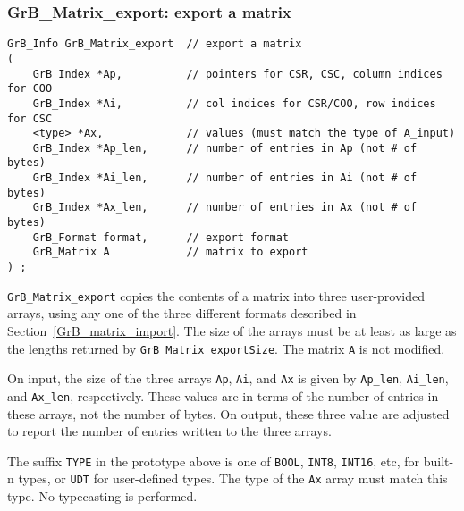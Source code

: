 \documentclass[12pt]{article}
\begin{document}
\subsubsection{{\sf GrB\_Matrix\_export:}  export a matrix}
\label{GrB_matrix_export}

\begin{mdframed}[userdefinedwidth=6in]
{\footnotesize
\begin{verbatim}
GrB_Info GrB_Matrix_export  // export a matrix
(
    GrB_Index *Ap,          // pointers for CSR, CSC, column indices for COO
    GrB_Index *Ai,          // col indices for CSR/COO, row indices for CSC
    <type> *Ax,             // values (must match the type of A_input)
    GrB_Index *Ap_len,      // number of entries in Ap (not # of bytes)
    GrB_Index *Ai_len,      // number of entries in Ai (not # of bytes)
    GrB_Index *Ax_len,      // number of entries in Ax (not # of bytes)
    GrB_Format format,      // export format
    GrB_Matrix A            // matrix to export
) ;
\end{verbatim}
} \end{mdframed}

\verb'GrB_Matrix_export' copies the contents of a matrix into three
user-provided arrays, using any one of the three different formats
described in Section~\ref{GrB_matrix_import}.  The size of the arrays must be
at least as large as the lengths returned by \verb'GrB_Matrix_exportSize'.  The
matrix \verb'A' is not modified.

On input, the size of the three arrays \verb'Ap', \verb'Ai', and \verb'Ax' is
given by \verb'Ap_len', \verb'Ai_len', and \verb'Ax_len', respectively.  These
values are in terms of the number of entries in these arrays, not the number of
bytes.  On output, these three value are adjusted to report the number of
entries written to the three arrays.

The suffix \verb'TYPE' in the prototype above is one of \verb'BOOL',
\verb'INT8', \verb'INT16', etc, for built-n types, or \verb'UDT' for
user-defined types.  The type of the \verb'Ax' array must match this type.  No
typecasting is performed.

\end{document}
